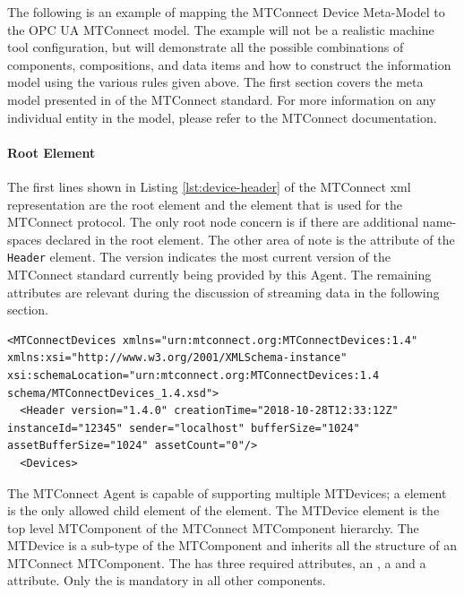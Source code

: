 The following is an example of mapping the MTConnect Device Meta-Model to the OPC UA MTConnect model. The example will not be a realistic machine tool configuration, but will demonstrate all the possible combinations of components, compositions, and data items and how to construct the information model using the various rules given above. The first section covers the meta model presented in \cite{MTCPart2} of the MTConnect standard. For more information on any individual entity in the model, please refer to the MTConnect documentation.

\paragraph{ Root Element}

The first lines shown in Listing \ref{lst:device-header} of the MTConnect \gls{xml} representation are the root element  and the  element that is used for the MTConnect protocol. The only root node concern is if there are additional name-spaces declared in the root  element. The other area of note is the  attribute of the \texttt{Header} element.  The version indicates the most current version of the MTConnect standard currently being provided by this \gls{Agent}. The remaining attributes are relevant during the discussion of streaming data in the following section.

\begin{lstlisting}[caption={Device Header},label={lst:device-header}]
<MTConnectDevices xmlns="urn:mtconnect.org:MTConnectDevices:1.4" xmlns:xsi="http://www.w3.org/2001/XMLSchema-instance" xsi:schemaLocation="urn:mtconnect.org:MTConnectDevices:1.4 schema/MTConnectDevices_1.4.xsd">
  <Header version="1.4.0" creationTime="2018-10-28T12:33:12Z" instanceId="12345" sender="localhost" bufferSize="1024" assetBufferSize="1024" assetCount="0"/>
  <Devices>
\end{lstlisting}

The MTConnect \gls{Agent} is capable of supporting multiple \glspl{MTDevice}; a  element is the only allowed child element of the  element. The \gls{MTDevice} element is the top level \gls{MTComponent} of the MTConnect \gls{MTComponent} hierarchy. The \gls{MTDevice} is a sub-type of the \gls{MTComponent} and inherits all the structure of an MTConnect \gls{MTComponent}. The  has three required attributes, an , a  and a  attribute. Only the  is mandatory in all other components. 

